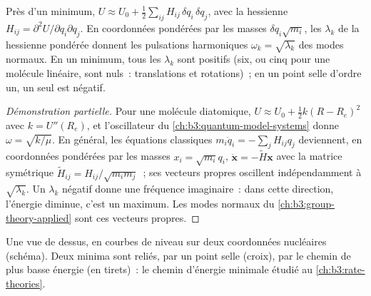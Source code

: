 \begin{proposition}\label{prop:b3:computational-chemistry:hessian}
Près d'un minimum, $U \approx U_0 + \frac12\sum_{ij}H_{ij}\,\delta q_i\,\delta q_j$, avec
la hessienne $H_{ij} = \partial^2U/\partial q_i\partial q_j$. En
coordonnées pondérées par les masses $\delta q_i\sqrt{m_i}$, les  $\lambda_k$ de la hessienne pondérée donnent les pulsations
harmoniques $\omega_k =
\sqrt{\lambda_k}$ des modes normaux. En un minimum, tous les $\lambda_k$
sont positifs (six, ou cinq pour une molécule linéaire, sont nuls~:
translations et rotations)~; en un point selle d'ordre un, un seul est
négatif.
\end{proposition}

\begin{proof}[Démonstration partielle]
Pour une molécule diatomique, $U \approx U_0 + \frac12k(R - R_e)^2$ avec
$k = U''(R_e)$, et
l'oscillateur du \cref{ch:b3:quantum-model-systems} donne $\omega =
\sqrt{k/\mu}$. En général, les équations classiques $m_i\ddot q_i =
-\sum_jH_{ij}q_j$ deviennent, en coordonnées pondérées par les masses
$x_i = \sqrt{m_i}q_i$,
$\ddot{\mathbf x} = -\tilde H\mathbf x$ avec la matrice symétrique $\tilde H_{ij} =
H_{ij}/\sqrt{m_im_j}$~; ses vecteurs propres oscillent indépendamment à
$\sqrt{\lambda_k}$. Un $\lambda_k$ négatif donne une fréquence
imaginaire~: dans cette direction, l'énergie diminue, c'est un maximum.
Les modes normaux du \cref{ch:b3:group-theory-applied} sont ces vecteurs
propres.
\end{proof}

\begin{omfigure}

{\small Une  vue de dessus, en courbes de
niveau sur deux coordonnées nucléaires (schéma). Deux minima sont reliés,
par un point selle (croix), par le chemin de plus basse énergie (en
tirets)~: le chemin d'énergie minimale étudié au
\cref{ch:b3:rate-theories}.}
\end{omfigure}

